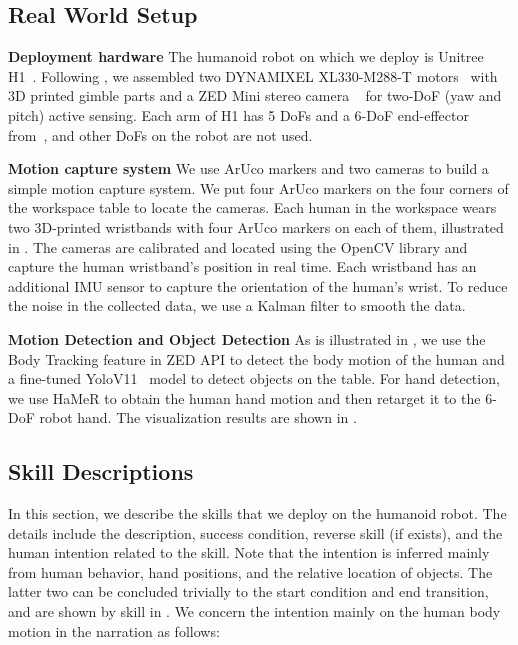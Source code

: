 \clearpage
\appendix
\label{sec:appendix}

\subsection{Real World Setup}

\noindent\textbf{Deployment hardware}
The humanoid robot on which we deploy \our is Unitree H1~\cite{H1-page}.
Following \citet{cheng2024tv}, we assembled two DYNAMIXEL XL330-M288-T motors~\citep{dynamixel-page} with 3D printed gimble parts and a ZED Mini stereo camera ~\cite{zed-page} for two-DoF (yaw and pitch) active sensing.
Each arm of H1 has 5 DoFs and a 6-DoF end-effector from~\cite{dexterous-page}, and other DoFs on the robot are not used.


\noindent\textbf{Motion capture system}
\label{app:mocap}
We use ArUco markers and two cameras to build a simple motion capture system.
We put four ArUco markers on the four corners of the workspace table to locate the cameras.
Each human in the workspace wears two 3D-printed wristbands with four ArUco markers on each of them, illustrated in . 
The cameras are calibrated and located using the OpenCV library and capture the human wristband's position in real time.
Each wristband has an additional IMU sensor to capture the orientation of the human's wrist.
To reduce the noise in the collected data, we use a Kalman filter to smooth the data.


\noindent\textbf{Motion Detection and Object Detection}
As is illustrated in , we use the Body Tracking feature in ZED API to detect the body motion of the human and a fine-tuned YoloV11~\cite{khanam2024yolov11} model to detect objects on the table. For hand detection, we use HaMeR\cite{pavlakos2024reconstructing} to obtain the human hand motion and then retarget\cite{qin2024anyteleopgeneralvisionbaseddexterous} it to the 6-DoF robot hand. The visualization results are shown in .


\subsection{Skill Descriptions}
\label{app:skills}
In this section, we describe the skills that we deploy on the humanoid robot. The details include the description, success condition, reverse skill (if exists), and the human intention related to the skill.
Note that the intention is inferred mainly from human behavior, hand positions, and the relative location of objects.
The latter two can be concluded trivially to the start condition and end transition, and are shown by skill in .
We concern the intention mainly on the human body motion in the narration as follows:


